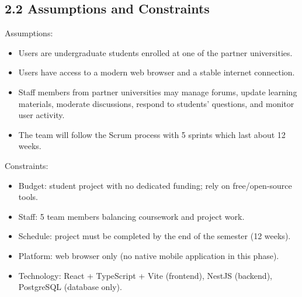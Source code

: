 \documentclass[12pt]{article}
\begin{document}
\subsection*{2.2 Assumptions and Constraints}
\par\medskip
Assumptions:
\par\medskip
\begin{itemize}
\item Users are undergraduate students enrolled at one of the partner universities.
\par
\item Users have access to a modern web browser and a stable internet connection.
\par
\item Staff members from partner universities may manage forums, update learning materials, moderate discussions, respond to students’ questions, and monitor user activity.
\par
\item The team will follow the Scrum process with 5 sprints which last about 12 weeks.
\par
\end{itemize}
Constraints:
\par\medskip
\begin{itemize}
\item Budget: student project with no dedicated funding; rely on free/\allowbreak{}open-source tools.
\par
\item Staff: 5 team members balancing coursework and project work.
\par
\item Schedule: project must be completed by the end of the semester (12 weeks).
\par
\item Platform: web browser only (no native mobile application in this phase).
\par
\item Technology: React + TypeScript + Vite (frontend), NestJS (backend), PostgreSQL (database only).
\par
\end{itemize}
\hypertarget{sec:23-project-deliverables}{}
\end{document}
